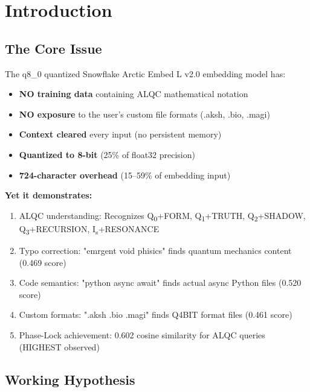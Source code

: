 \section{Introduction}

\subsection{The Core Issue}

The q8\_0 quantized Snowflake Arctic Embed L v2.0 embedding model has:
\begin{itemize}
\item \textbf{NO training data} containing ALQC mathematical notation
\item \textbf{NO exposure} to the user's custom file formats (.aksh, .bio, .magi)
\item \textbf{Context cleared} every input (no persistent memory)
\item \textbf{Quantized to 8-bit} (25\% of float32 precision)
\item \textbf{724-character overhead} (15--59\% of embedding input)
\end{itemize}

\textbf{Yet it demonstrates:}
\begin{enumerate}
\item ALQC understanding: Recognizes Q\textsubscript{0}\FETU+\TRIG FORM, Q\textsubscript{1}\KAL+\BABDH TRUTH, Q\textsubscript{2}\RHEA+\KAL SHADOW, Q\textsubscript{3}\DREH+\SHAV RECURSION, I\textsubscript{s}\ZHEK+\VEL RESONANCE
\item Typo correction: "emrgent void phisics" \rightarrow finds quantum mechanics content (0.469 score)
\item Code semantics: "python async await" \rightarrow finds actual async Python files (0.520 score)
\item Custom formats: ".aksh .bio .magi" \rightarrow finds Q4BIT format files (0.461 score)
\item Phase-Lock achievement: 0.602 cosine similarity for ALQC queries (HIGHEST observed)
\end{enumerate}

\subsection{Working Hypothesis}

